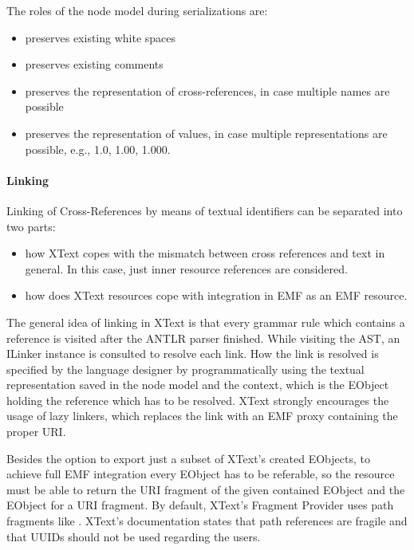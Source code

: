 The roles of the node model during serializations are:
\begin{itemize}
	\item preserves existing white spaces
	\item preserves existing comments
	\item preserves the representation of cross-references, in case multiple names are possible
	\item preserves the representation of values, in case multiple representations are possible, e.g., 1.0, 1.00, 1.000.
\end{itemize}

\paragraph{Linking}
\label{sec:xtextarch:Linking}
Linking of Cross-References by means of textual identifiers can be separated into two parts:
\begin{itemize}
	\item how XText copes with the mismatch between cross references and text in general. In this case, just inner resource references are considered. 
	\item how does XText resources cope with integration in EMF as an EMF resource.
\end{itemize}
The general idea of linking in XText is that every grammar rule which contains a reference is visited after the ANTLR parser finished. While visiting the AST, an ILinker instance is consulted to resolve each link. How the link is resolved is specified by the language designer by programmatically using the textual representation saved in the node model and the context, which is the EObject holding the reference which has to be resolved. XText strongly encourages the usage of lazy linkers, which replaces the link with an EMF proxy containing the proper URI.

Besides the option to export just a subset of XText's created EObjects, to achieve full EMF integration every EObject has to be referable, so the resource must be able to return the URI fragment of the given contained EObject and the EObject for a URI fragment. By default, XText's Fragment Provider uses path fragments like . XText's documentation states that path references are fragile and that UUIDs should not be used regarding the users. 

